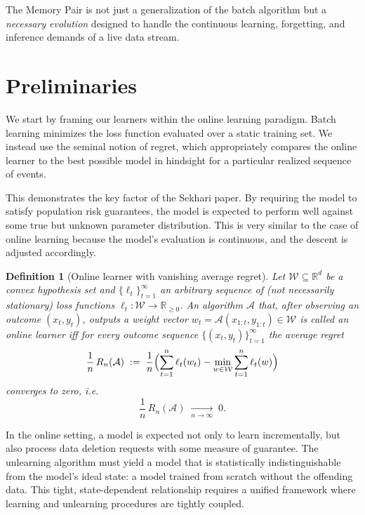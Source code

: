 \documentclass[a4paper,12pt]{article}
\newtheorem{definition}{Definition}
\begin{document}
The Memory Pair is not just a generalization of the batch algorithm but a \textit{necessary evolution} designed to handle the continuous learning, forgetting, and inference demands of a live data stream.

\section{Preliminaries}

We start by framing our learners within the online learning paradigm. Batch learning  minimizes the loss function evaluated over a static training set. We instead use the seminal notion of regret, which appropriately compares the online learner to the best possible model in hindsight for a particular realized sequence of events.

This demonstrates the key factor of the Sekhari paper. By requiring the model to satisfy population risk guarantees, the model is expected to perform well against some true but unknown parameter distribution. This is very similar to the case of online learning because the model's evaluation is continuous, and the descent is adjusted accordingly.

\begin{definition}[Online learner with vanishing average regret]
\label{def:online-learner}
Let $\mathcal W \subseteq \mathbb{R}^d$ be a convex hypothesis set and $\{\ell_t\}_{t=1}^\infty$ an arbitrary sequence of (not necessarily stationary) loss functions $\ell_t : \mathcal W \to \mathbb{R}_{\ge 0}$. An algorithm $\mathcal A$ that, after observing an outcome $(x_t,y_t)$, outputs a weight vector $w_t = \mathcal A(x_{1:t},y_{1:t}) \in \mathcal W$ is called an \emph{online learner} iff for every outcome sequence $\{(x_t,y_t)\}_{t=1}^\infty$ the \emph{average regret}
\[
  \frac{1}{n}\,R_n(\mathcal A)
  \;:=\;
  \frac{1}{n}
  \Bigl(
    \sum_{t=1}^{n}\ell_t(w_t)
    -
    \min_{w\in\mathcal W}\sum_{t=1}^{n}\ell_t(w)
  \Bigr)
\]
converges to zero,
i.e.
\[
  \frac{1}{n}\,R_n(\mathcal A)
  \;\xrightarrow[n\to\infty]{}\;0.
\]
\end{definition}

In the online setting, a model is expected not only to learn incrementally, but also process data deletion requests with some measure of guarantee. The unlearning algorithm must yield a model that is statistically indistinguishable from the model's ideal state: a model trained from scratch without the offending data. This tight, state-dependent relationship requires a unified framework where learning and unlearning procedures are tightly coupled.
\end{document}
